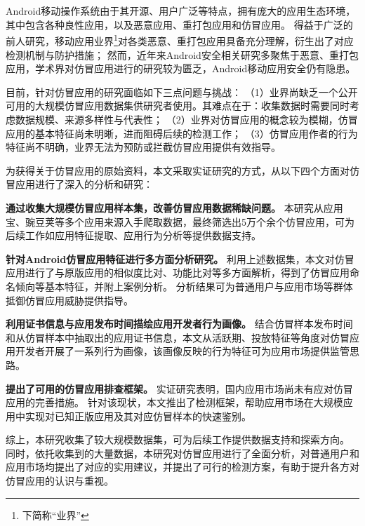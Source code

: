 \cleardoublepage{}

\chapter*{}
\vspace{-5mm}

\setlength{\baselineskip}{25pt} %

Android移动操作系统由于其开源、用户广泛等特点，拥有庞大的应用生态环境，其中包含各种良性应用，以及恶意应用、重打包应用和仿冒应用。
得益于广泛的前人研究，移动应用业界\footnote{下简称``业界''}对各类恶意、重打包应用具备充分理解，衍生出了对应检测机制与防护措施；
然而，近年来Android安全相关研究多聚焦于恶意、重打包应用，学术界对仿冒应用进行的研究较为匮乏，Android移动应用安全仍有隐患。

目前，针对仿冒应用的研究面临如下三点问题与挑战：
（1）业界尚缺乏一个公开可用的大规模仿冒应用数据集供研究者使用。其难点在于：收集数据时需要同时考虑数据规模、来源多样性与代表性；
（2）业界对仿冒应用的概念较为模糊，仿冒应用的基本特征尚未明晰，进而阻碍后续的检测工作；
（3）仿冒应用作者的行为特征尚不明确，业界无法为预防或拦截仿冒应用提供有效指导。

为获得关于仿冒应用的原始资料，本文采取实证研究的方式，从以下四个方面对仿冒应用进行了深入的分析和研究：

\textbf{通过收集大规模仿冒应用样本集，改善仿冒应用数据稀缺问题。}
本研究从应用宝、豌豆荚等多个应用来源入手爬取数据，最终筛选出5万个余个仿冒应用，可为后续工作如应用特征提取、应用行为分析等提供数据支持。

\textbf{针对Android仿冒应用特征进行多方面分析研究。}
利用上述数据集，本文对仿冒应用进行了与原版应用的相似度比对、功能比对等多方面解析，得到了仿冒应用命名倾向等基本特征，并附上案例分析。
分析结果可为普通用户与应用市场等群体抵御仿冒应用威胁提供指导。

\textbf{利用证书信息与应用发布时间描绘应用开发者行为画像。}
结合仿冒样本发布时间和从仿冒样本中抽取出的应用证书信息，本文从活跃期、投放特征等角度对仿冒应用开发者开展了一系列行为画像，该画像反映的行为特征可为应用市场提供监管思路。

\textbf{提出了可用的仿冒应用排查框架。}
实证研究表明，国内应用市场尚未有应对仿冒应用的完善措施。
针对该现状，本文推出了检测框架\mytool ，帮助应用市场在大规模应用中实现对已知正版应用及其对应仿冒样本的快速鉴别。

综上，本研究收集了较大规模数据集，可为后续工作提供数据支持和探索方向。
同时，依托收集到的大量数据，本研究对仿冒应用进行了全面分析，对普通用户和应用市场均提出了对应的实用建议，并提出了可行的检测方案，有助于提升各方对仿冒应用的认识与重视。

 

